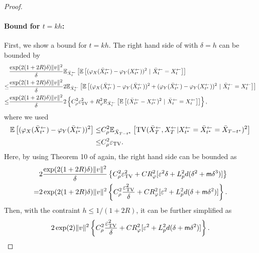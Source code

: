 \begin{proof}
\paragraph{Bound for $t = kh$:} 
First, we show a bound for $t = kh$. %
The right hand side of  with $\delta = h$ can be bounded by 
\begin{align}
& \frac{\exp(2(1 + 2R)\delta)\|v\|^2}{\delta}
\mathbb{E}_{\bar{X}_{t}^\leftarrow}\left[ \mathbb{E}\left[ (\varphi_X( \bar{X}_{t^*}^\leftarrow) - \varphi_Y( {X}_{t^*}^\leftarrow))^2  ~|~ \bar{X}_{t}^\leftarrow = {X}_{t}^\leftarrow \right] \right]\\
\leq &
 \frac{\exp(2(1 + 2R)\delta)\|v\|^2}{\delta}
2 \mathbb{E}_{\bar{X}_{t}^\leftarrow}\left[\mathbb{E}\left[ (\varphi_X( \bar{X}_{t^*}^\leftarrow) - 
\varphi_Y( \bar{X}_{t^*}^\leftarrow) )^2
+ (\varphi_Y( \bar{X}_{t^*}^\leftarrow) 
- \varphi_Y( {X}_{t^*}^\leftarrow))^2  ~|~ \bar{X}_{t}^\leftarrow = {X}_{t}^\leftarrow \right] \right]\\
\leq &
 \frac{\exp(2(1 + 2R)\delta)\|v\|^2}{\delta}
2\left\{ C_\rho^2 \varepsilon_{\mathrm{TV}}^2 + R_\varphi^2
\mathbb{E}_{\bar{X}_{t}^\leftarrow}\left[\mathbb{E}\left[ 
(\bar{X}_{t^*}^\leftarrow  
- {X}_{t^*}^\leftarrow)^2  ~|~ \bar{X}_{t}^\leftarrow = {X}_{t}^\leftarrow \right] \right] \right\},
\end{align}
where we used 
\begin{align}
 \mathbb{E}\left[ (\varphi_X( \bar{X}_{t^*}^\leftarrow) - 
\varphi_Y( \bar{X}_{t^*}^\leftarrow) )^2 \right]
\leq & C_\rho^2\mathbb{E}_{\bar{X}_{T-t^*}}\left[\mathrm{TV}(\bar{X}_{T}^\leftarrow,{X}_{T}^\leftarrow | {X}_{t^*}^\leftarrow = \bar{X}_{t^*}^\leftarrow = \bar{X}_{T-t^*})^2 \right]  \\
\leq & C_\rho^2 \varepsilon_{\mathrm{TV}}.
\end{align}
Here, by using Theorem 10 of \cite{chen2023sampling} again, 
the right hand side can be bounded as  
\begin{align}
& 2 \frac{\exp(2(1 + 2R)\delta)\|v\|^2}{\delta}
\left\{ C_\rho^2\varepsilon_{\mathrm{TV}}^2 + C R_\varphi^2  [\varepsilon^2 \delta + L_p^2 d(\delta^2 + \mathsf{m} \delta^3)]\right\} \\
= & 
2 \exp(2(1 + 2R)\delta)\|v\|^2
\left\{ C_\rho^2\frac{\varepsilon_{\mathrm{TV}}^2}{\delta} + C R_\varphi^2 [\varepsilon^2 + L_p^2 d(\delta + \mathsf{m} \delta^2)]\right\}.
\end{align}
Then, with the contraint $h \leq 1/(1+2R)$, it can be further simplified as 
$$
2 \exp(2)\|v\|^2
\left\{ C_\rho^2\frac{\varepsilon_{\mathrm{TV}}^2}{\delta} + C R_\varphi^2 [\varepsilon^2 + L_p^2 d(\delta + \mathsf{m} \delta^2)]\right\}.
$$
\end{proof}
